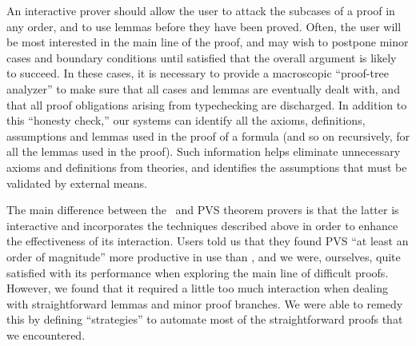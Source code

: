 An interactive prover should allow the user to attack the subcases of
a proof in any order, and to use lemmas before they have been proved.
Often, the user will be most interested in the main line of the
proof, and may wish to postpone minor cases and boundary conditions
until satisfied that the overall argument is likely to succeed.  In
these cases, it is necessary to provide a macroscopic ``proof-tree
analyzer'' to make sure that all cases and lemmas are eventually
dealt with, and that all proof obligations arising from typechecking
are discharged.  In addition to this ``honesty check,'' our systems
can identify all the axioms, definitions, assumptions and lemmas used
in the proof of a formula (and so on recursively, for all the lemmas
used in the proof).  Such information helps eliminate unnecessary
axioms and definitions from theories, and identifies the assumptions
that must be validated by external means.

The main difference between the \ehdm\ and PVS theorem provers is
that the latter is interactive and incorporates the techniques
described above in order to enhance the effectiveness of its
interaction.  Users told us that they found PVS ``at least an order
of magnitude'' more productive in use than \ehdm, and we were,
ourselves, quite satisfied with its performance when exploring the
main line of difficult proofs.  However, we found that it required a
little too much interaction when dealing with straightforward lemmas
and minor proof branches.  We were able to remedy this by defining
``strategies'' to automate most of the straightforward proofs that we
encountered.   

